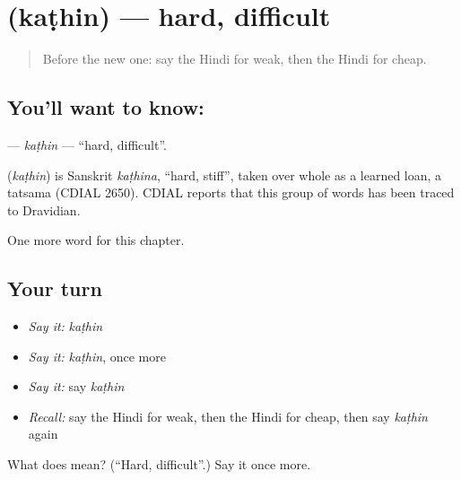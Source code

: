 \section[\texorpdfstring{\hi{कठिन} (kaṭhin)}{कठिन (kaṭhin)}]{ (kaṭhin) — hard, difficult}

\label{lesson:HI-C212-kathin}



\begin{quote}
Before the new one: say the Hindi for weak, then the Hindi for cheap.
\end{quote}

\subsection*{You'll want to know: }
\textbf{} — \emph{kaṭhin} — \textquotedblleft{}hard, difficult\textquotedblright{}.

\begin{cousinweb}
\textbf{} (\emph{kaṭhin}) is Sanskrit \emph{kaṭhina}, \textquotedblleft{}hard, stiff\textquotedblright{}, taken over whole as a learned loan, a tatsama (CDIAL 2650). CDIAL reports that this group of words has been traced to Dravidian.
\end{cousinweb}

\begin{grammarlens}[title={What you've built}]
One more word for this chapter.
\end{grammarlens}

\subsection*{Your turn}
\begin{itemize}
\raggedright
  \item \emph{Say it:} \emph{kaṭhin}
  \item \emph{Say it:} \emph{kaṭhin}, once more
  \item \emph{Say it:} say \emph{kaṭhin}
  \item \emph{Recall:} say the Hindi for weak, then the Hindi for cheap, then say \emph{kaṭhin} again
\end{itemize}

\begin{tcolorbox}[breakable,colback=teal!4,colframe=teal!35!black,title={Before you move on}]
What does  mean? (\textquotedblleft{}Hard, difficult\textquotedblright{}.) Say it once more.
\end{tcolorbox}
